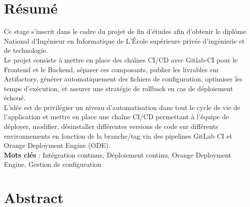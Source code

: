 \chapter*{\huge Résumé}


\begin{spacing}{1.2}

Ce stage s'inscrit dans le cadre du projet de fin d'études afin d'obtenir le diplôme National d'Ingénieur en Informatique de L'École supérieure privée d'ingénierie et de technologie.\\
Le projet consiste à  mettre en place des chaînes CI/CD avec Gitlab-CI pour le Frontend et le Backend, séparer ces composants, publier les livrables sur Artifactory, générer automatiquement des fichiers de configuration, optimiser les temps d'exécution, et assurer une stratégie de rollback en cas de déploiement échoué.\\
L'idée est de privilégier un niveau d'automatisation dans tout le cycle de vie de l'application et mettre en place une chaîne CI/CD permettant à l'équipe de déployer, modifier, désinstaller différentes versions de code sur différents environnements en fonction de la branche/tag via des pipelines GitLab CI et Orange Deployment Engine (ODE).\\

\textbf{Mots clés} : Intégration continue, Déploiement continu, Orange Deployment Engine, Gestion de configuration

\emergencystretch=2cm


\end{spacing}
\newpage
\chapter*{\huge Abstract}


